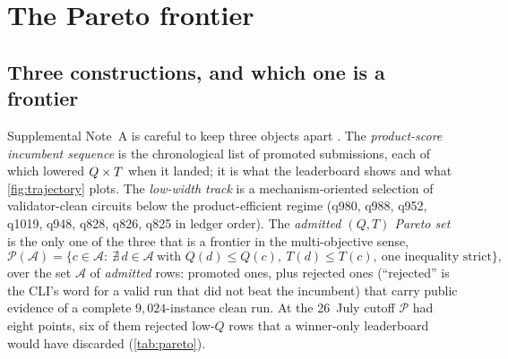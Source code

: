 \section{The Pareto frontier}\label{sec:pareto}

\subsection{Three constructions, and which one is a frontier}

Supplemental Note~A is careful to keep three objects apart \cite{ecdsafail-supp}. The \emph{product-score incumbent sequence} is the chronological list of promoted submissions, each of which lowered $Q\times T$ when it landed; it is what the leaderboard shows and what \cref{fig:trajectory} plots. The \emph{low-width track} is a mechanism-oriented selection of validator-clean circuits below the product-efficient regime (q980, q988, q952, q1019, q948, q828, q826, q825 in ledger order). The \emph{admitted $(Q,T)$ Pareto set} is the only one of the three that is a frontier in the multi-objective sense,
\begin{equation}\label{eq:pareto}
\mathcal P(\mathcal A)=\{c\in\mathcal A:\ \nexists\,d\in\mathcal A\ \text{with } Q(d)\le Q(c),\ T(d)\le T(c),\ \text{one inequality strict}\},
\end{equation}
over the set $\mathcal A$ of \emph{admitted} rows: promoted ones, plus rejected ones (``rejected'' is the CLI's word for a valid run that did not beat the incumbent) that carry public evidence of a complete $9{,}024$-instance clean run. At the 26~July cutoff $\mathcal P$ had eight points, six of them rejected low-$Q$ rows that a winner-only leaderboard would have discarded (\cref{tab:pareto}).

